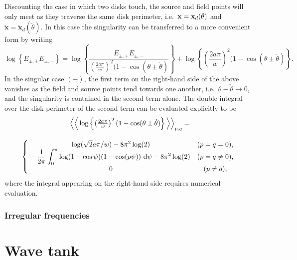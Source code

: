 \documentclass[12pt,a4paper]{article}
\newcommand{\wrt}{ ~ {\rm d}}
\newcommand{\ds}{\displaystyle}
\newcommand{\ie}{i.e.\ }
\newcommand{\rad}{a}
\newcommand{\bx}{{\bf x}}
\newcommand{\bxo}{\check{\textbf{x}}}
\newcommand{\tho}{\check{\theta}}
\begin{document}
Discounting the case in which two disks touch, the source and field points will only meet as they traverse the same disk perimeter, \ie $\bx=\bx_{d}(\theta)$ and $\bxo=\bxo_{d}(\tho)$.
In this case the singularity can be transferred to a more convenient form by writing
\begin{equation}\nonumber
\log\left\{
E_{\pm,+}
E_{\pm,-}
\right\}
=
\log\left\{
\frac{E_{\pm,+}
E_{\pm,-}}{
\left(\frac{2\rad\pi}{w} \right)^2(1-\cos(\theta\pm \tho)
}
\right\}
+
\log\left\{
\left(
\frac{2\rad\pi}{w} 
\right)^2(1-\cos(\theta\pm \tho)
\right\}
.
\end{equation}
In the singular case $(-)$, the first term on the right-hand side of the above vanishes as the field and source points tend towards one another, \ie $\theta-\tho\to 0$, and the singularity is contained in the second term alone.
The double integral over the disk perimeter of the second term can be evaluated explicitly to be
\begin{equation}
\begin{array}{c}
\Big\langle\Big\langle
\log\left\{
\left(
\frac{2\rad\pi}{w} 
\right)^2(1-\cos(\theta\pm \tho)
\right\}
\Big\rangle\Big\rangle_{p,q}
=
\\[18pt]
\left\{
\begin{array}{c c}
\log(\sqrt{2}\rad\pi/w)
-
8\pi^{2}\log(2)
&
(p=q=0),
\\
\ds
-
\frac{1}{2\pi}
\int_{0}^{\pi}
\log(1-\cos\psi)
(1-\cos(p\psi))
\wrt\psi
-
8\pi^{2}\log(2)
&
(p=q\neq 0),
\\
0 & (p\neq q),
\end{array}
\right.
\end{array}
\end{equation}
where the integral appearing on the right-hand side requires numerical evaluation.





%

\subsubsection{Irregular frequencies}



\section{Wave tank}
\end{document}
